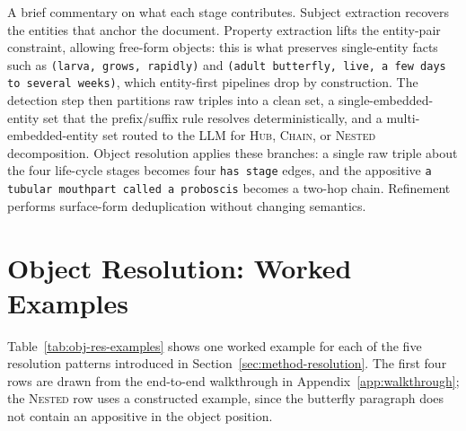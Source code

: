 \documentclass[11pt]{article}
\begin{document}
A brief commentary on what each stage contributes. Subject extraction recovers the entities that anchor the document. Property extraction lifts the entity-pair constraint, allowing free-form objects: this is what preserves single-entity facts such as \texttt{(larva, grows, rapidly)} and \texttt{(adult butterfly, live, a few days to several weeks)}, which entity-first pipelines drop by construction. The detection step then partitions raw triples into a clean set, a single-embedded-entity set that the prefix/suffix rule resolves deterministically, and a multi-embedded-entity set routed to the LLM for \textsc{Hub}, \textsc{Chain}, or \textsc{Nested} decomposition. Object resolution applies these branches: a single raw triple about the four life-cycle stages becomes four \texttt{has stage} edges, and the appositive \texttt{a tubular mouthpart called a proboscis} becomes a two-hop chain. Refinement performs surface-form deduplication without changing semantics.


\section{Object Resolution: Worked Examples}
\label{app:obj-res-examples}

Table~\ref{tab:obj-res-examples} shows one worked example for each of the five resolution patterns introduced in Section~\ref{sec:method-resolution}. The first four rows are drawn from the end-to-end walkthrough in Appendix~\ref{app:walkthrough}; the \textsc{Nested} row uses a constructed example, since the butterfly paragraph does not contain an appositive in the object position.
\end{document}
